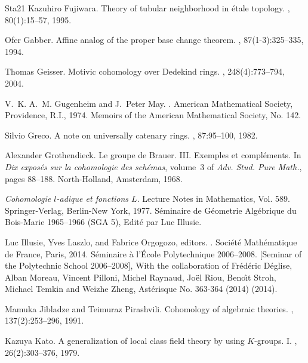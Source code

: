 \documentclass{amsart}
\theoremstyle{remark}
\numberwithin{equation}{subsection}
\begin{document}
\begin{thebibliography}{{Sta}21}
Kazuhiro Fujiwara.
\newblock Theory of tubular neighborhood in \'{e}tale topology.
, 80(1):15--57, 1995.

Ofer Gabber.
\newblock Affine analog of the proper base change theorem.
, 87(1-3):325--335, 1994.

Thomas Geisser.
\newblock Motivic cohomology over {D}edekind rings.
, 248(4):773--794, 2004.

V.~K. A.~M. Gugenheim and J.~Peter May.
.
\newblock American Mathematical Society, Providence, R.I., 1974.
\newblock Memoirs of the American Mathematical Society, No. 142.

Silvio Greco.
\newblock A note on universally catenary rings.
, 87:95--100, 1982.

Alexander Grothendieck.
\newblock Le groupe de {B}rauer. {III}. {E}xemples et compl\'ements.
\newblock In {\em Dix expos\'es sur la cohomologie des sch\'emas}, volume~3 of
  {\em Adv. Stud. Pure Math.}, pages 88--188. North-Holland, Amsterdam, 1968.

{\em Cohomologie {$l$}-adique et fonctions {$L$}}.
\newblock Lecture Notes in Mathematics, Vol. 589. Springer-Verlag, Berlin-New
  York, 1977.
\newblock S\'eminaire de G\'eometrie Alg\'ebrique du Bois-Marie 1965--1966 (SGA
  5), Edit\'e par Luc Illusie.

Luc Illusie, Yves Laszlo, and Fabrice Orgogozo, editors.
.
\newblock Soci\'et\'e Math\'ematique de France, Paris, 2014.
\newblock S\'eminaire \`a l'\'Ecole Polytechnique 2006--2008. [Seminar of the
  Polytechnic School 2006--2008], With the collaboration of Fr\'ed\'eric
  D\'eglise, Alban Moreau, Vincent Pilloni, Michel Raynaud, Jo\"el Riou,
  Beno\^\i t Stroh, Michael Temkin and Weizhe Zheng, Ast\'erisque No. 363-364
  (2014) (2014).

Mamuka Jibladze and Teimuraz Pirashvili.
\newblock Cohomology of algebraic theories.
, 137(2):253--296, 1991.

Kazuya Kato.
\newblock A generalization of local class field theory by using {$K$}-groups.
  {I}.
, 26(2):303--376, 1979.


\end{thebibliography}
\end{document}
